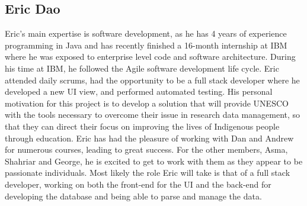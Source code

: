 \documentclass[11pt]{article}
\begin{document}
\subsection*{\textbf{Eric Dao}}
Eric's main expertise is software development, as he has 4 years of experience programming in Java and has recently finished a 16-month internship at IBM where he was exposed to enterprise level code and software architecture. During his time at IBM, he followed the Agile software development life cycle. Eric attended daily scrums, had the opportunity to be a full stack developer where he developed a new UI view, and performed automated testing. His personal motivation for this project is to develop a solution that will provide UNESCO with the tools necessary to overcome their issue in research data management, so that they can direct their focus on improving the lives of Indigenous people through education. Eric has had the pleasure of working with Dan and Andrew for numerous courses, leading to great success. For the other members, Asma, Shahriar and George, he is excited to get to work with them as they appear to be passionate individuals. Most likely the role Eric will take is that of a full stack developer, working on both the front-end for the UI and the back-end for developing the database and being able to parse and manage the data. \\
\end{document}
